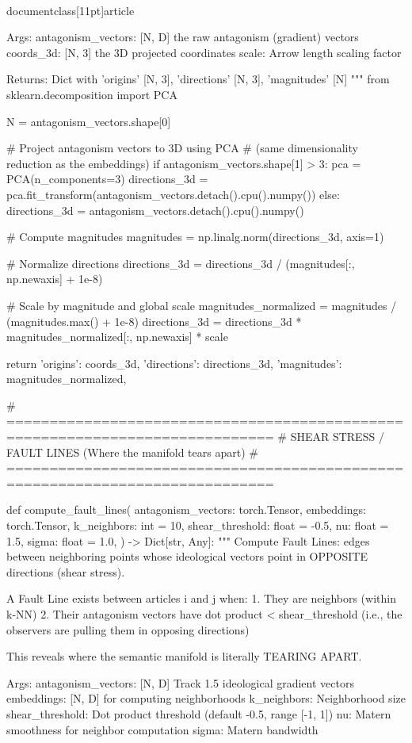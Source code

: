 \\documentclass[11pt]{article}
\begin{document}
\begin{CodeBlock}
    Args:
        antagonism_vectors: [N, D] the raw antagonism (gradient) vectors
        coords_3d: [N, 3] the 3D projected coordinates
        scale: Arrow length scaling factor

    Returns:
        Dict with 'origins' [N, 3], 'directions' [N, 3], 'magnitudes' [N]
    """
    from sklearn.decomposition import PCA

    N = antagonism_vectors.shape[0]

    # Project antagonism vectors to 3D using PCA
    # (same dimensionality reduction as the embeddings)
    if antagonism_vectors.shape[1] > 3:
        pca = PCA(n_components=3)
        directions_3d = pca.fit_transform(antagonism_vectors.detach().cpu().numpy())
    else:
        directions_3d = antagonism_vectors.detach().cpu().numpy()

    # Compute magnitudes
    magnitudes = np.linalg.norm(directions_3d, axis=1)

    # Normalize directions
    directions_3d = directions_3d / (magnitudes[:, np.newaxis] + 1e-8)

    # Scale by magnitude and global scale
    magnitudes_normalized = magnitudes / (magnitudes.max() + 1e-8)
    directions_3d = directions_3d * magnitudes_normalized[:, np.newaxis] * scale

    return {
        'origins': coords_3d,
        'directions': directions_3d,
        'magnitudes': magnitudes_normalized,
    }


# =============================================================================
# SHEAR STRESS / FAULT LINES (Where the manifold tears apart)
# =============================================================================

def compute_fault_lines(
    antagonism_vectors: torch.Tensor,
    embeddings: torch.Tensor,
    k_neighbors: int = 10,
    shear_threshold: float = -0.5,
    nu: float = 1.5,
    sigma: float = 1.0,
) -> Dict[str, Any]:
    """
    Compute Fault Lines: edges between neighboring points whose ideological
    vectors point in OPPOSITE directions (shear stress).

    A Fault Line exists between articles i and j when:
    1. They are neighbors (within k-NN)
    2. Their antagonism vectors have dot product < shear_threshold
       (i.e., the observers are pulling them in opposing directions)

    This reveals where the semantic manifold is literally TEARING APART.

    Args:
        antagonism_vectors: [N, D] Track 1.5 ideological gradient vectors
        embeddings: [N, D] for computing neighborhoods
        k_neighbors: Neighborhood size
        shear_threshold: Dot product threshold (default -0.5, range [-1, 1])
        nu: Matern smoothness for neighbor computation
        sigma: Matern bandwidth


\end{CodeBlock}
\end{document}
